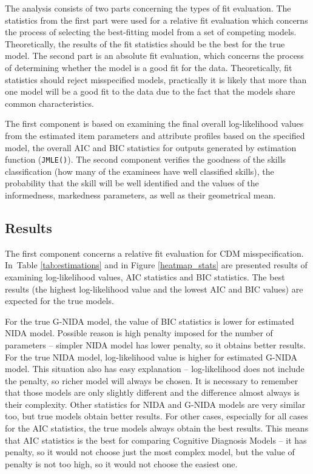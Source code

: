 \documentclass[english]{pwr_wmat_praca_dyplomowa}
\theoremstyle{plain}
\numberwithin{theorem}{chapter}
\theoremstyle{definition}
\numberwithin{theorem}{chapter}
\begin{document}
	The analysis consists of two parts concerning the types of fit evaluation. The statistics from the first part were used for a relative ﬁt evaluation which concerns the process of selecting the best-ﬁtting model from a set of competing models. Theoretically, the results of the fit statistics should be the best for the true model. The second part is an absolute fit evaluation, which concerns the process of determining whether the model is a good fit for the data. Theoretically, fit statistics should reject misspeciﬁed models, practically it is likely that more than one model will be a good fit to the data due to the fact that the models share common characteristics. 
	
	The first component is based on examining the final overall log-likelihood values from the estimated item parameters and attribute profiles based on the specified model, the overall AIC and BIC statistics for outputs generated by estimation function (\texttt{JMLE()}). The second component verifies the goodness of the skills classification (how many of the examinees have well classified skills), the probability that the skill will be well identified and the values of the informedness, markedness parameters, as well as their geometrical mean. 
	
	\subsection{Results}
	
	The first component concerns a relative ﬁt evaluation for CDM misspecification. In~Table \ref{tab:estimations} and in Figure \ref{heatmap_stats} are presented results of examining log-likelihood values, AIC statistics and BIC statistics. The best results (the highest log-likelihood value and the lowest AIC and BIC values) are expected for the true models. 
	
	For the true G-NIDA model, the value of BIC statistics is lower for estimated NIDA model. Possible reason is high penalty imposed for the number of parameters -- simpler NIDA model has lower penalty, so it obtains better results. For the true NIDA model, log-likelihood value is higher for estimated G-NIDA model. This situation also has easy explanation -- log-likelihood does not include the penalty, so richer model will always be chosen. It is necessary to remember that those models are only slightly different and the difference almost always is their complexity. Other statistics for NIDA and G-NIDA models are very similar too, but true models obtain better results. For other cases, especially for all cases for the AIC statistics, the true models always obtain the best results. This means that AIC statistics is the best for comparing Cognitive Diagnosis Models -- it has penalty, so it would not choose just the most complex model, but the value of penalty is not too high, so it would not choose the easiest one. 
	
\end{document}
